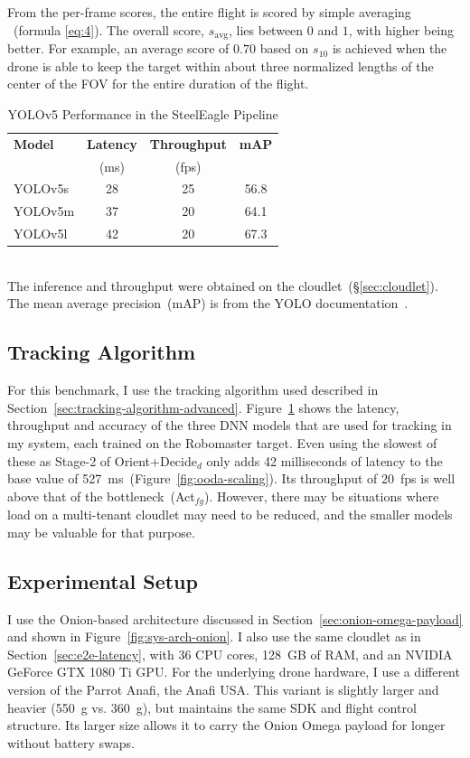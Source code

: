From the per-frame scores, the entire flight is scored by simple
averaging ~(formula \ref{eq:4}). The overall score, $s_{\text{avg}}$,
lies between $0$ and $1$, with higher being better. For
example, an average score of $0.70$ based on $s_{10}$ is achieved when
the drone is able to keep the target within about three normalized
lengths of the center of the FOV for the entire duration of the
flight.

\begin{table}
\centering
\begin{tabular}{|l|c|c|c|}
\hline
\textbf{Model} & \textbf{Latency} & \textbf{Throughput} & \textbf{mAP} \\
 & (ms) & (fps) & \\
\hline
YOLOv5s  & 28 & 25 & 56.8\\
YOLOv5m  & 37 & 20 & 64.1\\
YOLOv5l  & 42 & 20 & 67.3\\
\hline
\end{tabular}
\begin{captext}
  \\[0.1cm] \small The inference and throughput were obtained on the
  cloudlet~(\S\ref{sec:cloudlet}).  The mean average precision~(mAP)
  is from the YOLO documentation~\cite{Yolo}.
\end{captext}
\caption{YOLOv5 Performance in the SteelEagle Pipeline}
\label{fig:yolo-model-stats}
\end{table}


\subsection{Tracking Algorithm}
\label{sec:tracking-algorithm}
For this benchmark, I use the tracking algorithm used described in Section~\ref{sec:tracking-algorithm-advanced}. Figure~\ref{fig:yolo-model-stats} shows the latency, throughput and
accuracy of the three DNN models that are used for tracking in my
system, each trained on the Robomaster target.  Even using the slowest of these as Stage-2 of
Orient+Decide$_d$ only adds 42 milliseconds of latency to the base
value of 527~ms~(Figure~\ref{fig:ooda-scaling}).  Its throughput of
20~fps is well above that of the bottleneck~(Act$_{fg}$).  However,
there may be situations where load on a multi-tenant cloudlet may need
to be reduced, and the smaller models may be valuable for that
purpose.

\subsection{Experimental Setup}
\label{sec:experimental-setup-tracking}
I use the Onion-based architecture discussed in Section~\ref{sec:onion-omega-payload} and shown in Figure~\ref{fig:sys-arch-onion}. I also use the same cloudlet as in Section~\ref{sec:e2e-latency}, with 36 CPU cores, 128~GB of RAM, and an NVIDIA GeForce GTX 1080 Ti GPU. For the underlying drone hardware, I use a different version of the Parrot Anafi, the Anafi USA. This variant is slightly larger and heavier (550~g vs. 360~g), but maintains the same SDK and flight control structure. Its larger size allows it to carry the Onion Omega payload for longer without battery swaps.

